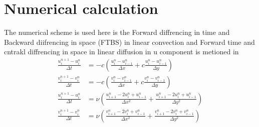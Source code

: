 \documentclass[conf]{new-aiaa}
\begin{document}
\section{Numerical calculation}
\par The numerical scheme is used here is the Forward diffrencing in time and Backward diifrencing in space (FTBS) in linear convection and Forward time and cntrakl diffrencing in space in linear diffusion in u component is metioned in  \\
\begin{align}
	\frac{u_i^{n+1}-u_i^n}{\Delta t} & =  -c \left( \frac{u_i^n-u_{i-1}^n}{\Delta x} + c\frac{u_i^n-u_{i-1}^n}{\Delta y} \right) \label{FTBS_01} \\
	\frac{v_i^{n+1}-v_i^n}{\Delta t} & =  -c \left( \frac{v_i^n-v_{i-1}^n}{\Delta x} + c\frac{v_i^n-v_{i-1}^n}{\Delta y} \right) \label{FTBS_02} \\
	\frac{u_i^{n+1}-u_i^n}{\Delta t} & = \nu \left( \frac{u_{i+1}^n-2u_i^n+u_{i-1}^n}{\Delta x^2} + \frac{u_{i+1}^n-2u_i^n+u_{i-1}^n}{\Delta y^2} \right)\label{FTCS_01}\\
	\frac{v_i^{n+1}-v_i^n}{\Delta t} & = \nu \left( \frac{v_{i+1}^n-2v_i^n+v_{i-1}^n}{\Delta x^2} + \frac{v_{i+1}^n-2v_i^n+v_{i-1}^n}{\Delta y^2} \right)\label{FTCS_02}
\end{align}
\end{document}
